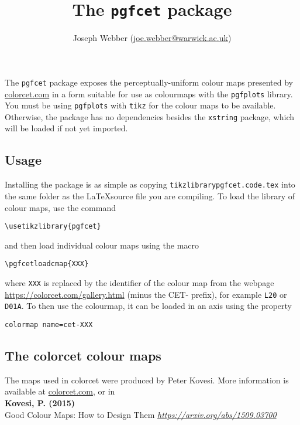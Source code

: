 \documentclass{article}
\begin{document}
    \title{The \texttt{pgfcet} package}
    \author{Joseph Webber (\href{mailto:joe.webber@warwick.ac.uk}{joe.webber@warwick.ac.uk})}
    \maketitle

    The \texttt{pgfcet} package exposes the perceptually-uniform colour maps presented by \href{https://colorcet.com}{colorcet.com} in a form suitable for use as colourmaps with the \texttt{pgfplots} library. You must be using \texttt{pgfplots} with \texttt{tikz} for the colour maps to be available. Otherwise, the package has no dependencies besides the \texttt{xstring} package, which will be loaded if not yet imported.

    \subsection*{Usage}
    Installing the package is as simple as copying \texttt{tikzlibrarypgfcet.code.tex} into the same folder as the \LaTeX source file you are compiling. To load the library of colour maps, use the command
    \begin{lstlisting}
\usetikzlibrary{pgfcet}
    \end{lstlisting}
    and then load individual colour maps using the macro
    \begin{lstlisting}
\pgfcetloadcmap{XXX}
    \end{lstlisting}
    where \texttt{XXX} is replaced by the identifier of the colour map from the webpage \href{https://colorcet.com/gallery.html}{https://colorcet.com/gallery.html} (minus the CET- prefix), for example \texttt{L20} or \texttt{D01A}. To then use the colourmap, it can be loaded in an axis using the property
    \begin{lstlisting}
colormap name=cet-XXX
    \end{lstlisting}

    \subsection*{The colorcet colour maps}
    The maps used in colorcet were produced by Peter Kovesi. More information is available at \href{https://colorcet.com}{colorcet.com}, or in\\

    {\color{gray}
    \noindent\textbf{Kovesi, P. (2015)}\\ Good Colour Maps: How to Design Them \textit{\href{arXiv:1509.03700 [cs.GR]}{https://arxiv.org/abs/1509.03700}}
    }
\end{document}
